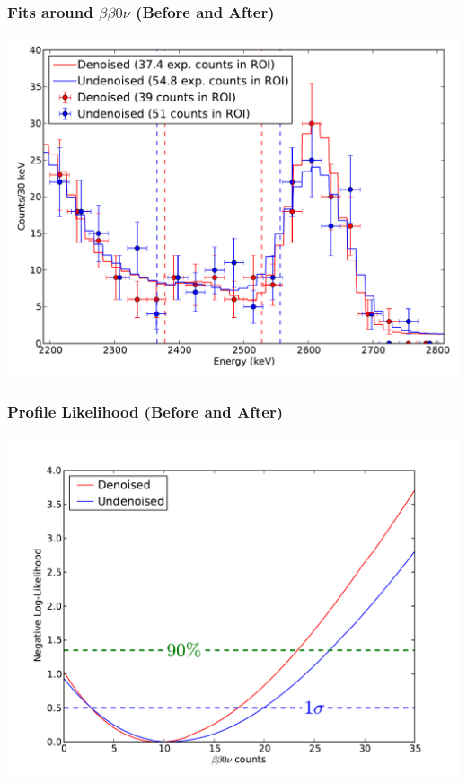 \documentclass{beamer}
\begin{document}
\begin{frame}
\begin{center}
\frametitle{Fits around $\beta \beta 0\nu$ (Before and After)}
\end{center}
\vspace{0.6cm}
\begin{center}
\includegraphics[keepaspectratio=true,width=\textwidth]{DenoisedVsUndenoised_TotalPdfsWithData.pdf}
\end{center}
\end{frame}

\begin{frame}
\begin{center}
\frametitle{Profile Likelihood (Before and After)}
\end{center}
\vspace{0.6cm}
\begin{center}
\includegraphics[keepaspectratio=true,width=\textwidth]{DenoisedVsUndenoised_bb0nProfiles.pdf}
\end{center}
\end{frame}
\end{document}
